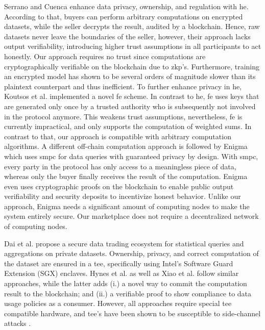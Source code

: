 Serrano and Cuenca \cite{serranoPeertoPeerOwnershipPreservingData2021} enhance data privacy, ownership, and regulation with \acrfull{he}. According to that, buyers can perform arbitrary computations on encrypted datasets, while the seller decrypts the result, audited by a blockchain. Hence, raw datasets never leave the boundaries of the seller, however, their approach lacks output verifiability, introducing higher trust assumptions in all participants to act honestly. Our approach requires no trust since computations are cryptographically verifiable on the blockchain due to \acrshort{zkp}'s. Furthermore, training an encrypted model has shown to be several orders of magnitude slower than its plaintext counterpart and thus inefficient. To further enhance privacy in \acrshort{he}, Koutsos et al. \cite{koutsosAgoraPrivacyAwareData} implemented a novel \acrfull{fe} scheme. In contrast to \acrshort{he}, \acrshort{fe} uses keys that are generated only once by a trusted authority who is subsequently not involved in the protocol anymore. This weakens trust assumptions, nevertheless, \acrshort{fe} is currently impractical, and \cite{koutsosAgoraPrivacyAwareData} only supports the computation of weighted sums. In contrast to that, our approach is compatible with arbitrary computation algorithms. A different off-chain computation approach is followed by Enigma \cite{shrobeEnigmaDecentralizedComputation2018} which uses \acrfull{smpc} for data queries with guaranteed privacy by design. With \acrshort{smpc}, every party in the protocol has only access to a meaningless piece of data, whereas only the buyer finally receives the result of the computation. Enigma even uses cryptographic proofs on the blockchain to enable public output verifiability and security deposits to incentivize honest behavior. Unlike our approach, Enigma needs a significant amount of computing nodes to make the system entirely secure. Our marketplace does not require a decentralized network of computing nodes.

Dai et al. propose a secure data trading ecosystem \cite{daiSDTESecureBlockchainBased2020} for statistical queries and aggregations on private datasets. Ownership, privacy, and correct computation of the dataset are ensured in a \acrfull{tee}, specifically using Intel’s Software Guard Extension (SGX) enclaves. Hynes et al. \cite{hynesDemonstrationSterlingPrivacypreserving2018a} as well as Xiao et al. \cite{xiaoPrivacyGuardEnforcingPrivate2020} follow similar approaches, while the latter adds (i.) a novel way to commit the computation result to the blockchain; and (ii.) a verifiable proof to show compliance to data usage policies as a consumer. However, all approaches require special \acrshort{tee} compatible hardware, and \acrshort{tee}'s have been shown to be susceptible to side-channel attacks \cite{brasserSoftwareGrandExposure,biondoGuardDilemmaEfficient}.

